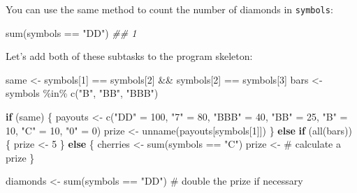 \documentclass[
  letterpaper,
  DIV=11,
  numbers=noendperiod]{scrbook}
\newenvironment{Shaded}{\begin{snugshade}}{\end{snugshade}}
\newcommand{\CommentTok}[1]{\textcolor[rgb]{0.37,0.37,0.37}{#1}}
\newcommand{\ControlFlowTok}[1]{\textcolor[rgb]{0.00,0.23,0.31}{\textbf{#1}}}
\newcommand{\DecValTok}[1]{\textcolor[rgb]{0.68,0.00,0.00}{#1}}
\newcommand{\DocumentationTok}[1]{\textcolor[rgb]{0.37,0.37,0.37}{\textit{#1}}}
\newcommand{\FunctionTok}[1]{\textcolor[rgb]{0.28,0.35,0.67}{#1}}
\newcommand{\NormalTok}[1]{\textcolor[rgb]{0.00,0.23,0.31}{#1}}
\newcommand{\OtherTok}[1]{\textcolor[rgb]{0.00,0.23,0.31}{#1}}
\newcommand{\SpecialCharTok}[1]{\textcolor[rgb]{0.37,0.37,0.37}{#1}}
\newcommand{\StringTok}[1]{\textcolor[rgb]{0.13,0.47,0.30}{#1}}
\begin{document}
You can use the same method to count the number of diamonds in
\texttt{symbols}:

\begin{Shaded}
\begin{Highlighting}[]
\FunctionTok{sum}\NormalTok{(symbols }\SpecialCharTok{==} \StringTok{"DD"}\NormalTok{)}
\DocumentationTok{\#\# 1}
\end{Highlighting}
\end{Shaded}

Let's add both of these subtasks to the program skeleton:

\begin{Shaded}
\begin{Highlighting}[]
\NormalTok{same }\OtherTok{\textless{}{-}}\NormalTok{ symbols[}\DecValTok{1}\NormalTok{] }\SpecialCharTok{==}\NormalTok{ symbols[}\DecValTok{2}\NormalTok{] }\SpecialCharTok{\&\&}\NormalTok{ symbols[}\DecValTok{2}\NormalTok{] }\SpecialCharTok{==}\NormalTok{ symbols[}\DecValTok{3}\NormalTok{]}
\NormalTok{bars }\OtherTok{\textless{}{-}}\NormalTok{ symbols }\SpecialCharTok{\%in\%} \FunctionTok{c}\NormalTok{(}\StringTok{"B"}\NormalTok{, }\StringTok{"BB"}\NormalTok{, }\StringTok{"BBB"}\NormalTok{)}

\ControlFlowTok{if}\NormalTok{ (same) \{}
\NormalTok{  payouts }\OtherTok{\textless{}{-}} \FunctionTok{c}\NormalTok{(}\StringTok{"DD"} \OtherTok{=} \DecValTok{100}\NormalTok{, }\StringTok{"7"} \OtherTok{=} \DecValTok{80}\NormalTok{, }\StringTok{"BBB"} \OtherTok{=} \DecValTok{40}\NormalTok{, }\StringTok{"BB"} \OtherTok{=} \DecValTok{25}\NormalTok{, }
    \StringTok{"B"} \OtherTok{=} \DecValTok{10}\NormalTok{, }\StringTok{"C"} \OtherTok{=} \DecValTok{10}\NormalTok{, }\StringTok{"0"} \OtherTok{=} \DecValTok{0}\NormalTok{)}
\NormalTok{  prize }\OtherTok{\textless{}{-}} \FunctionTok{unname}\NormalTok{(payouts[symbols[}\DecValTok{1}\NormalTok{]])}
\NormalTok{\} }\ControlFlowTok{else} \ControlFlowTok{if}\NormalTok{ (}\FunctionTok{all}\NormalTok{(bars)) \{}
\NormalTok{  prize }\OtherTok{\textless{}{-}} \DecValTok{5}
\NormalTok{\} }\ControlFlowTok{else}\NormalTok{ \{}
\NormalTok{  cherries }\OtherTok{\textless{}{-}} \FunctionTok{sum}\NormalTok{(symbols }\SpecialCharTok{==} \StringTok{"C"}\NormalTok{)}
\NormalTok{  prize }\OtherTok{\textless{}{-}} \CommentTok{\# calculate a prize}
\NormalTok{\}}

\NormalTok{diamonds }\OtherTok{\textless{}{-}} \FunctionTok{sum}\NormalTok{(symbols }\SpecialCharTok{==} \StringTok{"DD"}\NormalTok{)}
\CommentTok{\# double the prize if necessary}
\end{Highlighting}
\end{Shaded}
\end{document}
